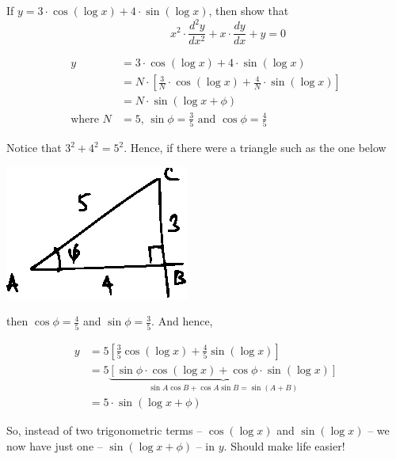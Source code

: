 \documentclass[14pt,fleqn]{extarticle}
\begin{document}
\newcommand\sine{\sin \left( \log x + \phi \right) }
\newcommand\cosine{\cos \left( \log x + \phi \right)}
\newcommand\scos{\cos \left(\log x \right) }
\newcommand\ssin{\sin \left(\log x \right) }

If $y = 3\cdot \cos \left(\log x \right) + 4\cdot \sin \left(\log x \right)$, then show 
that \[ \qquad \qquad x^2\cdot \frac{d^2 y}{dx^2} + x\cdot \frac{dy}{dx} + y = 0 \]
%

\newcard 

\begin{align}
	y &= 3\cdot \cos \left(\log x \right) + 4\cdot \sin \left(\log x \right) \\ 
	&= N\cdot \left[\frac{3}{N} \cdot \cos \left(\log x \right) + \frac{4}{N}\cdot \sin \left(\log x \right) \right] \\
	&= N\cdot \sine  \\
	\text{where } N &= 5,\,\sin\phi = \frac{3}{5}\text{ and } \cos\phi = \frac{4}{5}
\end{align}

\newcard 

Notice that $3^2 + 4^2 = 5^2$. Hence, if there were a triangle such as the one below 

\begin{center} 
\includegraphics[scale=1.7]{figure.eps} 
\end{center} 

then $\cos\phi = \frac{4}{5}$ and $\sin\phi = \frac{3}{5}$. And hence, 

\begin{align}
	y &= 5 \left[\frac{3}{5}\scos  + \frac{4}{5} \ssin \right] \\
	&= 5 \underbrace{\left[\sin\phi \cdot \scos + \cos\phi\cdot \ssin \right]}_{\sin A\cos B + \cos A\sin B = \sin \left(A+B \right)} \\
	&= 5 \cdot \sine 
\end{align}

So, instead of two trigonometric terms -- $\scos$ and $\ssin$ -- we now have just one -- $\sine$ -- in $y$. Should make life easier! 
\end{document}
